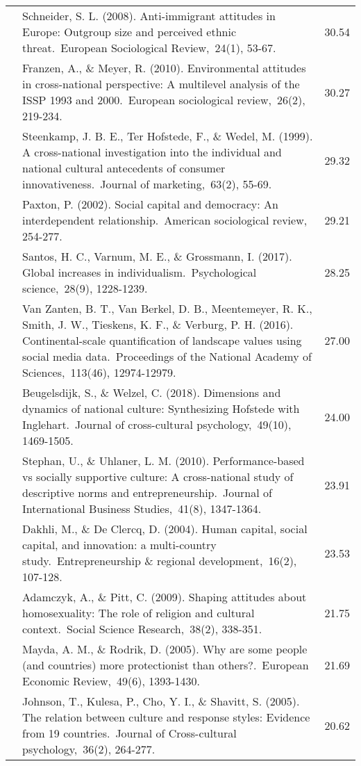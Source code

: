 \documentclass[
  man,floatsintext]{apa6}
\begin{document}
\begin{center}
\begin{ThreePartTable}
{\begin{longtable}{m{2cm}m{11cm}m{2cm}}
 & Schneider, S. L. (2008). Anti-immigrant attitudes in Europe: Outgroup size and perceived ethnic threat. European Sociological Review, 24(1), 53-67. & 30.54\\
 & Franzen, A., \& Meyer, R. (2010). Environmental attitudes in cross-national perspective: A multilevel analysis of the ISSP 1993 and 2000. European sociological review, 26(2), 219-234. & 30.27\\
 & Steenkamp, J. B. E., Ter Hofstede, F., \& Wedel, M. (1999). A cross-national investigation into the individual and national cultural antecedents of consumer innovativeness. Journal of marketing, 63(2), 55-69. & 29.32\\
 & Paxton, P. (2002). Social capital and democracy: An interdependent relationship. American sociological review, 254-277. & 29.21\\
 & Santos, H. C., Varnum, M. E., \& Grossmann, I. (2017). Global increases in individualism. Psychological science, 28(9), 1228-1239. & 28.25\\
 & Van Zanten, B. T., Van Berkel, D. B., Meentemeyer, R. K., Smith, J. W., Tieskens, K. F., \& Verburg, P. H. (2016). Continental-scale quantification of landscape values using social media data. Proceedings of the National Academy of Sciences, 113(46), 12974-12979. & 27.00\\
 & Beugelsdijk, S., \& Welzel, C. (2018). Dimensions and dynamics of national culture: Synthesizing Hofstede with Inglehart. Journal of cross-cultural psychology, 49(10), 1469-1505. & 24.00\\
 & Stephan, U., \& Uhlaner, L. M. (2010). Performance-based vs socially supportive culture: A cross-national study of descriptive norms and entrepreneurship. Journal of International Business Studies, 41(8), 1347-1364. & 23.91\\
 & Dakhli, M., \& De Clercq, D. (2004). Human capital, social capital, and innovation: a multi-country study. Entrepreneurship \& regional development, 16(2), 107-128. & 23.53\\
 & Adamczyk, A., \& Pitt, C. (2009). Shaping attitudes about homosexuality: The role of religion and cultural context. Social Science Research, 38(2), 338-351. & 21.75\\
 & Mayda, A. M., \& Rodrik, D. (2005). Why are some people (and countries) more protectionist than others?. European Economic Review, 49(6), 1393-1430. & 21.69\\
 & Johnson, T., Kulesa, P., Cho, Y. I., \& Shavitt, S. (2005). The relation between culture and response styles: Evidence from 19 countries. Journal of Cross-cultural psychology, 36(2), 264-277. & 20.62\\

\end{longtable}}
\end{ThreePartTable}
\end{center}
\end{document}
